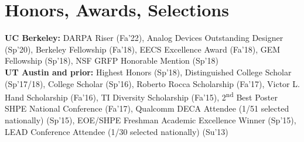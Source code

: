 \documentclass[line]{res}
\begin{document}
\begin{resume}
\begin{multicols}{2}
\end{multicols}

\vspace{-7mm}


\section{\Large{Honors, Awards, Selections}}
\label{sec:honors}
\vspace{2mm}

\textbf{UC Berkeley:} DARPA Riser (Fa'22), Analog Devices Outstanding Designer (Sp'20), Berkeley Fellowship (Fa'18), EECS Excellence Award (Fa'18), GEM Fellowship (Sp'18), NSF GRFP Honorable Mention (Sp'18) \\
\textbf{UT Austin and prior:} Highest Honors (Sp'18),
Distinguished College Scholar (Sp'17/18),
College Scholar (Sp'16),
Roberto Rocca Scholarship (Fa'17),
Victor L. Hand Scholarship (Fa'16),
TI Diversity Scholarship (Fa'15),
2\textsuperscript{nd} Best Poster SHPE National Conference (Fa'17),
Qualcomm DECA Attendee (1/51 selected nationally) (Sp'15),
EOE/SHPE Freshman Academic Excellence Winner (Sp'15),
LEAD Conference Attendee (1/30 selected nationally) (Su'13)

\end{resume}
\end{document}
